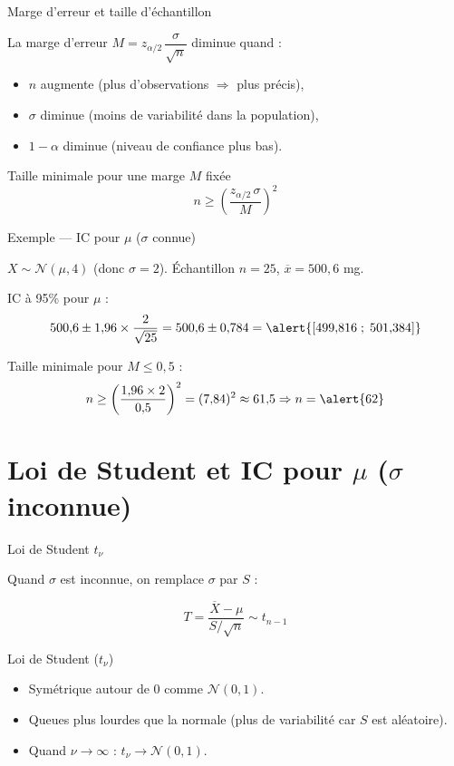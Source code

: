 \documentclass{BeamerTemplate}
\begin{document}
\begin{frame}[t]{Marge d'erreur et taille d'échantillon}

La marge d'erreur $M = z_{\alpha/2}\,\dfrac{\sigma}{\sqrt{n}}$ diminue quand :
\begin{itemize}\itemsep3mm
  \item $n$ augmente (plus d'observations $\Rightarrow$ plus précis),
  \item $\sigma$ diminue (moins de variabilité dans la population),
  \item $1-\alpha$ diminue (niveau de confiance plus bas).
\end{itemize}

\bigskip
\begin{Boite}{Taille minimale pour une marge $M$ fixée}
$$n \ge \left(\frac{z_{\alpha/2}\,\sigma}{M}\right)^2$$
\end{Boite}

\end{frame}

\begin{frame}[t]{Exemple — IC pour $\mu$ ($\sigma$ connue)}

$X \sim \mathcal{N}(\mu, 4)$ (donc $\sigma = 2$). Échantillon $n=25$, $\overline{x} = 500{,}6$ mg.

\bigskip
IC à 95\% pour $\mu$ :
$$500{,}6 \pm 1{,}96 \times \frac{2}{\sqrt{25}} = 500{,}6 \pm 0{,}784 = \alert{[499{,}816 \;;\; 501{,}384]}$$

\bigskip
Taille minimale pour $M \le 0{,}5$ :
$$n \ge \left(\frac{1{,}96 \times 2}{0{,}5}\right)^2 = (7{,}84)^2 \approx 61{,}5 \Rightarrow n = \alert{62}$$

\end{frame}

\section{Loi de Student et IC pour \texorpdfstring{$\mu$}{mu} (\texorpdfstring{$\sigma$}{sigma} inconnue)}

\begin{frame}[t]{Loi de Student $t_\nu$}

Quand $\sigma$ est \alert{inconnue}, on remplace $\sigma$ par $S$ :

$$T = \frac{\overline{X} - \mu}{S/\sqrt{n}} \sim t_{n-1}$$

\begin{Boite}{Loi de Student ($t_\nu$)}
\begin{itemize}
  \item Symétrique autour de 0 comme $\mathcal{N}(0,1)$.
  \item Queues plus lourdes que la normale (plus de variabilité car $S$ est aléatoire).
  \item Quand $\nu \to \infty$ : $t_\nu \to \mathcal{N}(0,1)$.
\end{itemize}
\end{Boite}

\end{frame}
\end{document}
